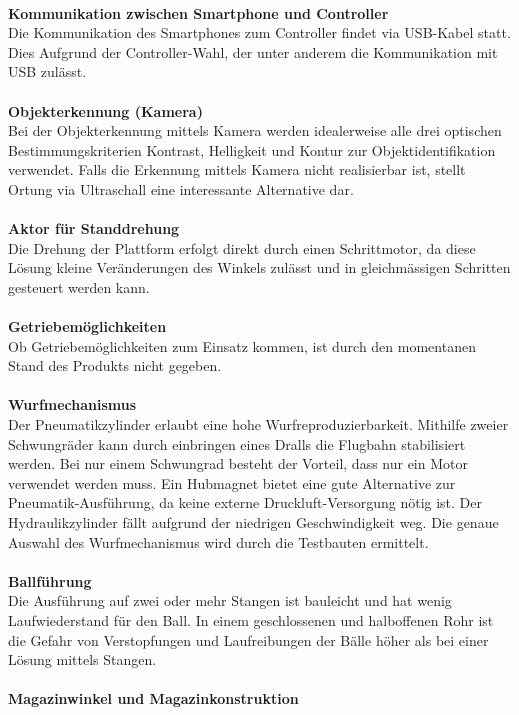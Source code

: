 	\\
	\textbf{Kommunikation zwischen Smartphone und Controller}\\
	Die Kommunikation des Smartphones zum Controller findet via USB-Kabel statt. Dies Aufgrund der Controller-Wahl, der unter anderem die Kommunikation mit USB zulässt.\\
	\\
	\textbf{Objekterkennung (Kamera)}\\
	Bei der Objekterkennung mittels Kamera werden idealerweise alle drei optischen Bestimmungskriterien Kontrast, Helligkeit und Kontur zur Objektidentifikation verwendet. Falls die Erkennung mittels Kamera nicht realisierbar ist, stellt Ortung via Ultraschall eine interessante Alternative dar.\\
	\\
	\textbf{Aktor für Standdrehung}\\
	Die Drehung der Plattform erfolgt direkt durch einen Schrittmotor, da diese Lösung kleine Veränderungen des Winkels zulässt und in gleichmässigen Schritten gesteuert werden kann.\\
	\\
	\textbf{Getriebemöglichkeiten}\\
	Ob Getriebemöglichkeiten zum Einsatz kommen, ist durch den momentanen Stand des Produkts nicht gegeben.\\
	\\
	\textbf{Wurfmechanismus}\\
	Der Pneumatikzylinder erlaubt eine hohe Wurfreproduzierbarkeit. Mithilfe zweier Schwungräder kann durch einbringen eines Dralls die Flugbahn stabilisiert werden. Bei nur einem Schwungrad besteht der Vorteil, dass nur ein Motor verwendet werden muss. Ein Hubmagnet bietet eine gute Alternative zur Pneumatik-Ausführung, da keine externe Druckluft-Versorgung nötig ist. Der Hydraulikzylinder fällt aufgrund der niedrigen Geschwindigkeit weg. Die genaue Auswahl des Wurfmechanismus wird durch die Testbauten ermittelt.\\
	\\
	\textbf{Ballführung}\\
	Die Ausführung auf zwei oder mehr Stangen ist bauleicht und hat wenig Laufwiederstand für den Ball. In einem geschlossenen und halboffenen Rohr ist die Gefahr von Verstopfungen und Laufreibungen der Bälle höher als bei einer Lösung mittels Stangen.\\
	\\
	\textbf{Magazinwinkel und Magazinkonstruktion}\\
